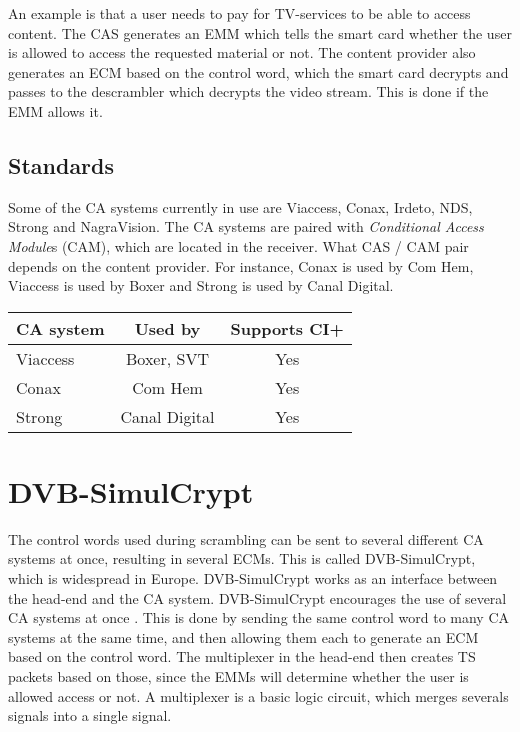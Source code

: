 An example is that a user needs to pay for TV-services to be able 
to access content. The CAS generates an EMM which tells the smart card 
whether the user is allowed to access the requested material or not. 
The content provider also generates an ECM based on the control word, 
which the smart card decrypts and passes to the descrambler which 
decrypts the video stream. This is done if the EMM allows it.

\subsection{Standards}
Some of the CA systems currently in use are Viaccess, Conax, Irdeto, 
NDS, Strong and NagraVision. The CA systems are paired with 
\emph{Conditional Access Module}s (CAM), which are located in the 
receiver. What CAS / CAM pair depends on the content provider. For 
instance, Conax is used by Com Hem, Viaccess is used by Boxer and 
Strong is used by Canal Digital.

\begin{longtable}{| l | c | c |}
  \hline
  CA system & Used by & Supports CI+ \\ \hline
  
  Viaccess & Boxer, SVT & Yes \\ \hline
  Conax & Com Hem & Yes \\ \hline
  Strong & Canal Digital & Yes \\ \hline
\end{longtable}

\section{DVB-SimulCrypt} \label{sec:Simul}
The control words used during scrambling can be sent to several 
different CA systems at once, resulting in several ECMs. This is 
called DVB-SimulCrypt, which is widespread in Europe. DVB-SimulCrypt 
works as an interface between the head-end and the CA system. 
DVB-SimulCrypt encourages the use of several CA systems at once 
\citep{SimulCrypt:2008}. This is done by sending the same control word 
to many CA systems at the same time, and then allowing them each to 
generate an ECM  based on the control word. The multiplexer in the 
head-end then creates TS packets based on those, since the EMMs 
will determine whether the user is allowed access or not. A 
multiplexer is a basic logic circuit, which merges severals signals 
into a single signal.

